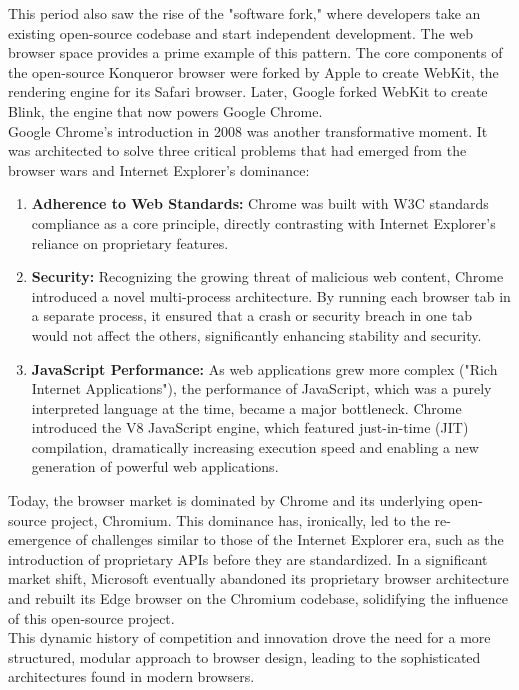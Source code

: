 \documentclass{scrbook}
\begin{document}
This period also saw the rise of the "software fork," where developers take an existing open-source codebase and start independent development. The web browser space provides a prime example of this pattern. The core components of the open-source Konqueror browser were forked by Apple to create WebKit, the rendering engine for its Safari browser. Later, Google forked WebKit to create Blink, the engine that now powers Google Chrome. \\

Google Chrome's introduction in 2008 was another transformative moment. It was architected to solve three critical problems that had emerged from the browser wars and Internet Explorer's dominance:

\begin{enumerate}
    \item \textbf{Adherence to Web Standards:} Chrome was built with W3C standards compliance as a core principle, directly contrasting with Internet Explorer's reliance on proprietary features.
    \item \textbf{Security:} Recognizing the growing threat of malicious web content, Chrome introduced a novel multi-process architecture. By running each browser tab in a separate process, it ensured that a crash or security breach in one tab would not affect the others, significantly enhancing stability and security.
    \item \textbf{JavaScript Performance:} As web applications grew more complex ("Rich Internet Applications"), the performance of JavaScript, which was a purely interpreted language at the time, became a major bottleneck. Chrome introduced the V8 JavaScript engine, which featured just-in-time (JIT) compilation, dramatically increasing execution speed and enabling a new generation of powerful web applications.
\end{enumerate}

Today, the browser market is dominated by Chrome and its underlying open-source project, Chromium. This dominance has, ironically, led to the re-emergence of challenges similar to those of the Internet Explorer era, such as the introduction of proprietary APIs before they are standardized. In a significant market shift, Microsoft eventually abandoned its proprietary browser architecture and rebuilt its Edge browser on the Chromium codebase, solidifying the influence of this open-source project. \\

This dynamic history of competition and innovation drove the need for a more structured, modular approach to browser design, leading to the sophisticated architectures found in modern browsers.
\end{document}
